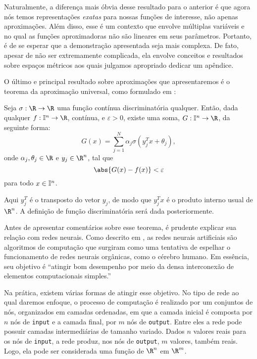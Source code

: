 Naturalmente, a diferença mais óbvia desse resultado para o anterior é que agora nós temos representações \emph{exatas} para nossas funções de interesse, não apenas aproximações.
Além disso, esse é um contexto que envolve múltiplas variáveis e no qual as funções aproximadoras não são lineares em seus parâmetros.
Portanto, é de se esperar que a demonstração apresentada seja mais complexa.
De fato, apesar de não ser extremamente complicada, ela envolve conceitos e resultados sobre espaços métricos aos quais julgamos apropriado dedicar um apêndice.

O último e principal resultado sobre aproximações que apresentaremos é o teorema da aproximação universal, como formulado em \cite{cybenko89}:
\begin{TAU}
    Seja \( \sigma : \R \to \R \) uma função contínua discriminatória qualquer.
    Então, dada qualquer \( f : \I^{ n } \to \R \), contínua, e \( \varepsilon > 0 \), existe uma soma, \( G : \I^{ n } \to \R \), da seguinte forma:
    \begin{equation}
        G(x) = \sum_{ j=1 }^{ N } \alpha_{ j } \sigma(y_{ j }^{ T }x + \theta_{ j })
        \label{eq: neural_func_form}
    ,\end{equation}
    onde \( \alpha_{ j }, \theta_{ j } \in \R \) e \( y_{ j } \in \R^{ n } \), tal que \[
        \abs{ G(x) - f(x) } < \varepsilon
    \]
    para todo \( x \in \mathbb{I}^{ n } \).
\end{TAU}

Aqui \( y_{ j }^{ T } \) é o transposto do vetor \( y_{ j } \), de modo que \( y_{ j }^{ T }x \) é o produto interno usual de \( \R^{ n } \).
A definição de função discriminatória será dada posteriormente.

Antes de apresentar comentários sobre esse teorema, é prudente explicar sua relação com redes neurais.
Como descrito em \cite{lipmann}, as redes neurais artificiais são algoritmos de computação que surgiram como uma tentativa de espelhar o funcionamento de redes neurais orgânicas, como o cérebro humano.
Em essência, seu objetivo é ``atingir bom desempenho por meio da densa interconexão de elementos computacionais simples.''

Na prática, existem várias formas de atingir esse objetivo.
No tipo de rede ao qual daremos enfoque, o processo de computação é realizado por um conjuntos de nós, organizados em camadas ordenadas, em que a camada inicial é composta por \( n \) nós de \verb|input| e a camada final, por \( m \) nós de \verb|output|.
Entre eles a rede pode possuir camadas intermediárias de tamanho variado.
Dados \( n \) valores reais para os nós de \verb|input|, a rede produz, nos nós de \verb|output|, \( m \) valores, também reais.
Logo, ela pode ser considerada uma função de \( \R^{ n } \) em \( \R^{ m } \).

